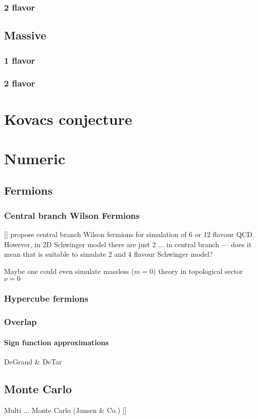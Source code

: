 \documentclass[12pt,a4paper]{report}
\begin{document}
\subsection{2 flavor}

\section{Massive}

\subsection{1 flavor}

\subsection{2 flavor}


\chapter{Kovacs conjecture}



\chapter{Numeric}

\section{Fermions}

\subsection{Central branch Wilson Fermions}

[] propose central branch Wilson fermions for simulation of 6 or 12 flavour QCD. However, in 2D Schwinger model there are just 2 ... in central branch --- does it mean that is suitable to simulate 2 and 4 flavour Schwinger model?

Maybe one could even simulate massless ($m = 0$) theory in topological sector $\nu = 0$ 

\subsection{Hypercube fermions}

\subsection{Overlap}

\subsubsection{Sign function approximations}

DeGrand \& DeTar

\section{Monte Carlo}

Multi ... Monte Carlo (Jansen \& Co.) []
\end{document}
